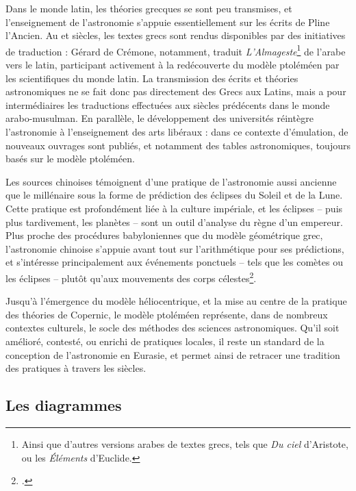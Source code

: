 	Dans le monde latin, les théories grecques se sont peu transmises, et l'enseignement de l'astronomie s'appuie essentiellement sur les écrits de Pline l'Ancien. Au \xii et \xiii siècles, les textes grecs sont rendus disponibles par des initiatives de traduction : Gérard de Crémone, notamment, traduit \textit{L'Almageste}\footnote{Ainsi que d'autres versions arabes de textes grecs, tels que \textit{Du ciel} d'Aristote, ou les \textit{Éléments} d'Euclide.} de l'arabe vers le latin, participant activement à la redécouverte du modèle ptoléméen par les scientifiques du monde latin. La transmission des écrits et théories astronomiques ne se fait donc pas directement des Grecs aux Latins, mais a pour intermédiaires les traductions effectuées aux siècles prédécents dans le monde arabo-musulman. En parallèle, le développement des universités réintègre l'astronomie à l'enseignement des arts libéraux : dans ce contexte d'émulation, de nouveaux ouvrages sont publiés, et notamment des tables astronomiques, toujours basés sur le modèle ptoléméen.
	
	Les sources chinoises témoignent d'une pratique de l'astronomie aussi ancienne que le \ii millénaire \jc sous la forme de prédiction des éclipses du Soleil et de la Lune. Cette pratique est profondément liée à la culture impériale, et les éclipses -- puis plus tardivement, les planètes -- sont un outil d'analyse du règne d'un empereur. Plus proche des procédures babyloniennes que du modèle géométrique grec, l'astronomie chinoise s'appuie avant tout sur l'arithmétique pour ses prédictions, et s'intéresse principalement aux événements ponctuels -- tels que les comètes ou les éclipses -- plutôt qu'aux mouvements des corps célestes\footcite{evansHistoryAstronomy}.
	
	Jusqu'à l'émergence du modèle héliocentrique, et la mise au centre de la pratique des théories de Copernic, le modèle ptoléméen représente, dans de nombreux contextes culturels, le socle des méthodes des sciences astronomiques. Qu'il soit amélioré, contesté, ou enrichi de pratiques locales, il reste un standard de la conception de l'astronomie en Eurasie, et permet ainsi de retracer une tradition des pratiques à travers les siècles.

\subsection{Les diagrammes}

